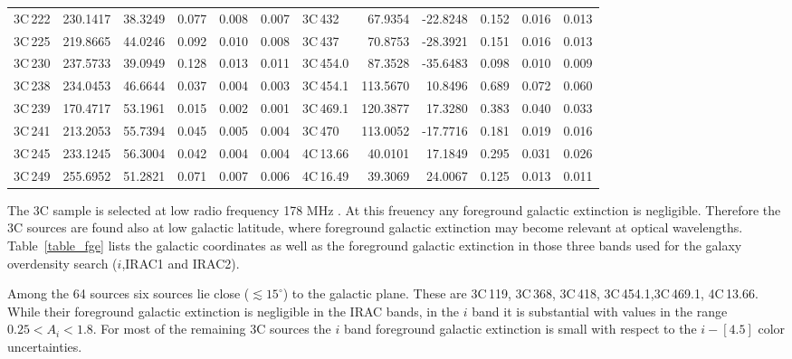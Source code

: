\documentclass[mathleft,fleqn,%
]{an}
\begin{document}
\begin{table*}
\begin{tabular}{lrrrrr|lrrrrr}
3C\,222      &   230.1417 &    38.3249 & 0.077    & 0.008  & 0.007  &  3C\,432      &    67.9354 &   -22.8248 &  0.152   & 0.016  & 0.013   \\
3C\,225      &   219.8665 &    44.0246 & 0.092    & 0.010  & 0.008  &  3C\,437      &    70.8753 &   -28.3921 &  0.151   & 0.016  & 0.013   \\
3C\,230      &   237.5733 &    39.0949 & 0.128    & 0.013  & 0.011  &  3C\,454.0    &    87.3528 &   -35.6483 &  0.098   & 0.010  & 0.009   \\
3C\,238      &   234.0453 &    46.6644 & 0.037    & 0.004  & 0.003  &  3C\,454.1    &   113.5670 &    10.8496 &  0.689   & 0.072  & 0.060   \\
3C\,239      &   170.4717 &    53.1961 & 0.015    & 0.002  & 0.001  &  3C\,469.1    &   120.3877 &    17.3280 &  0.383   & 0.040  & 0.033   \\
3C\,241      &   213.2053 &    55.7394 & 0.045    & 0.005  & 0.004  &  3C\,470      &   113.0052 &   -17.7716 &  0.181   & 0.019  & 0.016   \\
3C\,245      &   233.1245 &    56.3004 & 0.042    & 0.004  & 0.004  &  4C\,13.66    &    40.0101 &    17.1849 &  0.295   & 0.031  & 0.026   \\
3C\,249      &   255.6952 &    51.2821 & 0.071    & 0.007  & 0.006  &  4C\,16.49    &    39.3069 &    24.0067 &  0.125   & 0.013  & 0.011   \\
\hline
\end{tabular}
\end{table*}


The 3C sample is selected at low radio frequency 178 MHz
\citep{Spinrad85}. At this freuency any 
foreground galactic extinction is negligible. Therefore the 3C sources
are found also at low galactic latitude, where foreground galactic
extinction may become relevant at optical wavelengths. 
Table~\ref{table_fge} lists the galactic coordinates as well as the
foreground galactic 
extinction in those three bands used for the galaxy overdensity search
($i$,IRAC1 and IRAC2).

Among the 64 sources six sources lie close ($\lesssim 15^{\circ}$) to
the galactic plane.  
These are
3C\,119, 3C\,368, 3C\,418, 3C\,454.1,3C\,469.1, 4C\,13.66.
While their foreground galactic
extinction is negligible in the IRAC bands, 
in the $i$ band it is substantial with values 
in the range $0.25 < A_{i} < 1.8$. 
For most of the remaining 3C sources the  $i$ band foreground galactic
extinction is small with respect to the $i - [4.5]$ color uncertainties.
\end{document}
